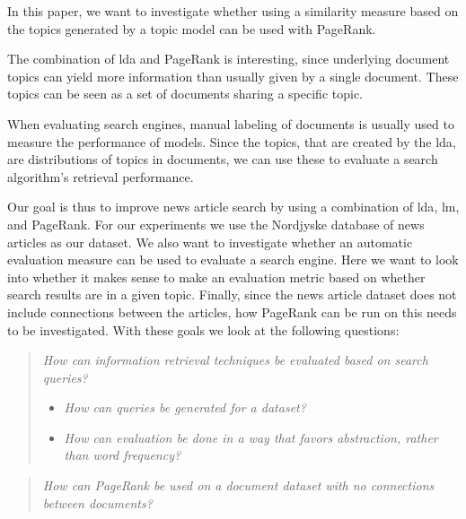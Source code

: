 In this paper, we want to investigate whether using a similarity measure based on the topics generated by a topic model can be used with PageRank.

The combination of \gls{lda} and PageRank is interesting, since underlying document topics can yield more information than usually given by a single document.
These topics can be seen as a set of documents sharing a specific topic. 

When evaluating search engines, manual labeling of documents is usually used to measure the performance of models\cite{yang2009topic}\cite{Tang2008}.
Since the topics, that are created by the \gls{lda}, are distributions of topics in documents, we can use these to evaluate a search algorithm's retrieval performance. 

Our goal is thus to improve news article search by using a combination of \gls{lda}, \gls{lm}, and PageRank.
For our experiments we use the Nordjyske database of news articles as our dataset.
We also want to investigate whether an automatic evaluation measure can be used to evaluate a search engine.
Here we want to look into whether it makes sense to make an evaluation metric based on whether search results are in a given topic.
Finally, since the news article dataset does not include connections between the articles, how PageRank can be run on this needs to be investigated.
With these goals we look at the following questions:

\begin{quote}
	\emph{How can information retrieval techniques be evaluated based on search queries?}
	\begin{itemize}
		\item \emph{How can queries be generated for a dataset?}
		\item \emph{How can evaluation be done in a way that favors abstraction, rather than word frequency?}
	\end{itemize}
\end{quote}
\vspace{0.1 cm}

\begin{quote}
	\emph{How can PageRank be used on a document dataset with no connections between documents?}
\end{quote}




